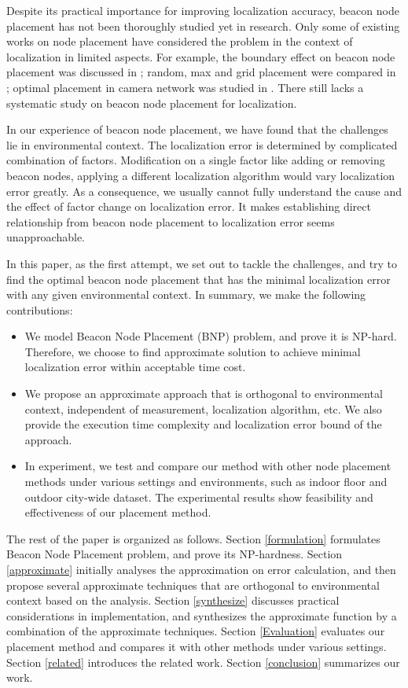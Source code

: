 \documentclass[10pt, conference, letterpaper]{IEEEtran}
\begin{document}
Despite its practical importance for improving localization accuracy, beacon node placement has not been thoroughly studied yet in research. Only some of existing works on node placement have considered the problem in the context of localization in limited aspects. For example, the boundary effect on beacon node placement was discussed in \cite{Boundary08}; random, max and grid placement were compared in \cite{Grid01}; optimal placement in camera network was studied in \cite{Camera06}. There still lacks a systematic study on beacon node placement for localization.

In our experience of beacon node placement, we have found that the challenges lie in environmental context. The localization error is determined by complicated combination of factors. Modification on a single factor like adding or removing beacon nodes, applying a different localization algorithm would vary localization error greatly. As a consequence, we usually cannot fully understand the cause and the effect of factor change on localization error. It makes establishing direct relationship from beacon node placement to localization error seems unapproachable.

In this paper, as the first attempt, we set out to tackle the challenges, and try to find the optimal beacon node placement that has the minimal localization error with any given environmental context. In summary, we make the following contributions:
\begin{itemize}
  \item We model Beacon Node Placement (BNP) problem, and prove it is NP-hard. Therefore, we choose to find approximate solution to achieve minimal localization error within acceptable time cost.
  \item We propose an approximate approach that is orthogonal to environmental context, independent of measurement, localization algorithm, etc. We also provide the execution time complexity and localization error bound of the approach.
  \item In experiment, we test and compare our method with other node placement methods under various settings and environments, such as  indoor floor and outdoor city-wide dataset. The experimental results show feasibility and effectiveness of our placement method.
\end{itemize}

The rest of the paper is organized as follows. Section \ref{formulation} formulates Beacon Node Placement problem, and prove its NP-hardness. Section \ref{approximate} initially analyses the approximation on error calculation, and then propose several approximate techniques that are orthogonal to environmental context based on the analysis. Section \ref{synthesize} discusses practical considerations in implementation, and synthesizes the approximate function by a combination of the approximate techniques. Section \ref{Evaluation} evaluates our placement method and compares it with other methods under various settings. Section \ref{related} introduces the related work. Section \ref{conclusion} summarizes our work.
\end{document}
